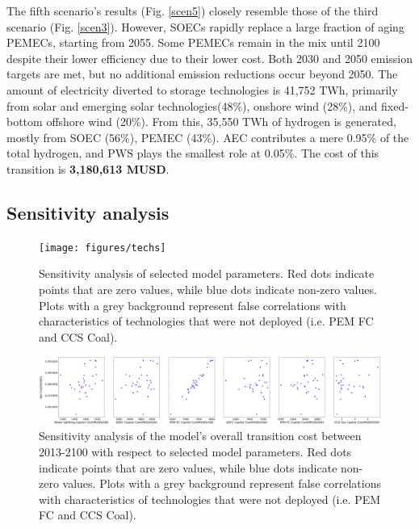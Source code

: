 The fifth scenario's results (Fig. \ref{scen5}) closely resemble those of the third scenario (Fig. \ref{scen3}). However, \gls{SOEC}s rapidly replace a large fraction of aging \gls{PEMEC}s, starting from 2055. Some \gls{PEMEC}s remain in the mix until 2100 despite their lower efficiency due to their lower cost. Both 2030 and 2050 emission targets are met, but no additional emission reductions occur beyond 2050. The amount of electricity diverted to storage technologies is 41,752 TWh, primarily from solar and emerging solar technologies(48\%), onshore wind (28\%), and fixed-bottom offshore wind (20\%). From this, 35,550 TWh of hydrogen is generated, mostly from \gls{SOEC} (56\%), \gls{PEMEC} (43\%). \gls{AEC} contributes a mere 0.95\% of the total hydrogen, and \gls{PWS} plays the smallest role at 0.05\%. The cost of this transition is \textbf{3,180,613 MUSD}.

\subsection{Sensitivity analysis}

\begin{figure}[h] 
\centering
\hspace*{-3cm}
\texttt{[image: figures/techs]}
\caption{Sensitivity analysis of selected model parameters. Red dots indicate points that are zero values, while blue dots indicate non-zero values. Plots with a grey background represent false correlations with characteristics of technologies that were not deployed (i.e. PEM FC and CCS Coal). }
\label{sa-techs}
\end{figure}

\begin{figure}[h] 
\centering
\hspace*{-3cm}
\includegraphics[scale=0.2]{figures/syscost}
\caption{Sensitivity analysis of the model's overall transition cost between 2013-2100 with respect to selected model parameters.  Red dots indicate points that are zero values, while blue dots indicate non-zero values. Plots with a grey background represent false correlations with characteristics of technologies that were not deployed (i.e. PEM FC and CCS Coal).}
\label{sa-syscost}
\end{figure}

